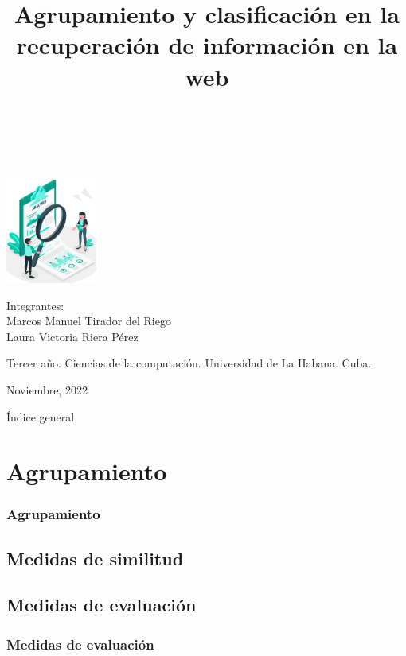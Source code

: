 \documentclass[t,compress,10pt,xcolor=dvipsnames]{beamer}
\title{\textbf{Agrupamiento y clasificaci\'on en la recuperaci\'on de informaci\'on en la web}}
\date{}
\begin{document}
	
	\begin{frame}
		\begin{center}
			\begin{block}{}
				\centering
				\Large\textcolor{white}{\textbf{Agrupamiento y clasificaci\'on en la recuperaci\'on de informaci\'on en la web}}
			\end{block}
		
		\vspace{0.5em}
		\includegraphics[width=3cm]{clustering.jpg}
		
		\vspace{0.5em}
		\footnotesize
		Integrantes:\\
			Marcos Manuel Tirador del Riego\\ 
			Laura Victoria Riera P\'erez
		
		\vspace{0.7em}
		\tiny	
		Tercer año. Ciencias de la computaci\'on. Universidad de La Habana. Cuba.
		
		\vspace{0.7em}
		\scriptsize
		Noviembre, 2022
		\end{center}
	\end{frame}

	\begin{frame}[allowframebreaks]{\'Indice general}
		\tableofcontents[sections={1}]
		\framebreak
		\tableofcontents[sections={2-4}]
	\end{frame}


	\section{Agrupamiento}
	\frame
	{
		\frametitle{Agrupamiento}
	}
	
	\subsection{Medidas de similitud}
	
	\subsection{Medidas de evaluaci\'on}
	\frame
	{
		\frametitle{Medidas de evaluaci\'on}	
	}
\end{document}
